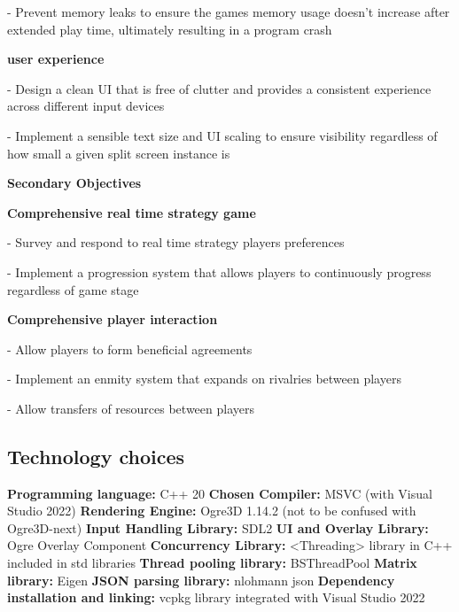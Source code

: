 \documentclass[]{final_report}
\begin{document}
 - Prevent memory leaks to ensure the games memory usage doesn’t increase after extended play time, ultimately resulting in a program crash

 \textbf{user experience} \newline

 - Design a clean UI that is free of clutter and provides a consistent experience across different input devices

 - Implement a sensible text size and UI scaling to ensure visibility regardless of how small a given split screen instance is 

\textbf{Secondary Objectives} \newline

\textbf{Comprehensive real time strategy game}\newline

 - Survey and respond to real time strategy players preferences
 
 - Implement a progression system that allows players to continuously progress regardless of game stage
 
 \textbf{Comprehensive player interaction} \newline
 
 - Allow players to form beneficial agreements 
 
 - Implement an enmity system that expands on rivalries between players
 
 - Allow transfers of resources between players
 

\subsection{Technology choices}

\textbf{Programming language: } C++ 20 \newline
\textbf{Chosen Compiler: } MSVC (with Visual Studio 2022) \newline
\textbf{Rendering Engine:} Ogre3D 1.14.2 (not to be confused with Ogre3D-next) \newline
\textbf{Input Handling Library:} SDL2 \newline
\textbf{UI and Overlay Library: } Ogre Overlay Component \newline
\textbf{Concurrency Library: } <Threading> library in C++ included in std libraries \newline
\textbf{Thread pooling library: } BSThreadPool \newline
\textbf{Matrix library: } Eigen \newline
\textbf{JSON parsing library: } nlohmann json \newline 
\textbf{Dependency installation and linking: } vcpkg library integrated with Visual Studio 2022 \newline
\end{document}
